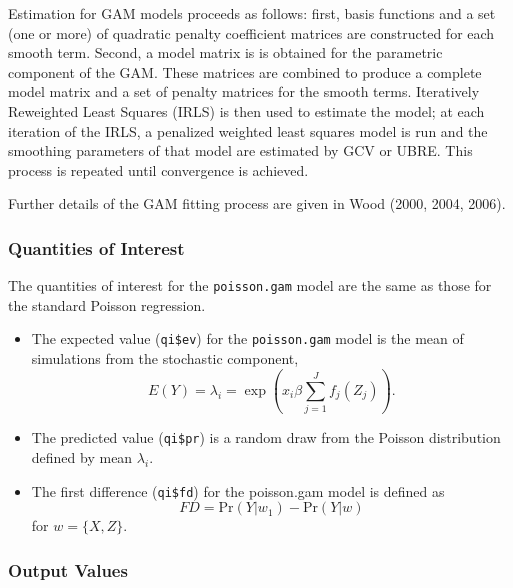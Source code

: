 Estimation for GAM models proceeds as follows: first, basis functions and a set (one or more) of quadratic penalty coefficient matrices are constructed for each smooth term. Second, a model matrix is is obtained for the parametric component of the GAM. These matrices are combined to produce a complete model matrix and a set of penalty matrices for the smooth terms. Iteratively Reweighted Least Squares (IRLS) is then used to estimate the model; at each iteration of the IRLS, a penalized weighted least squares model is run and the smoothing parameters of that model are estimated by GCV or UBRE. This process is repeated until convergence is achieved. 

Further details of the GAM fitting process are given in Wood (2000, 2004, 2006). 




\subsubsection{Quantities of Interest}
The quantities of interest for the {\tt poisson.gam} model are the same as those for the standard Poisson regression. 
\begin{itemize}
\item The expected value ({\tt qi\$ev}) for the {\tt poisson.gam} model is the mean of simulations from the stochastic component,  
\begin{equation*}
E(Y) = \lambda_{i} =  \exp \left(x_{i}\beta \sum_{j=1}^{J} f_j(Z_j) \right).
\end{equation*}


\item The predicted value ({\tt qi\$pr}) is a random draw from the Poisson distribution defined by mean $\lambda_i$. 

\item The first difference ({\tt qi\$fd}) for the poisson.gam model is defined as 
\begin{equation*}
FD = \text{Pr}(Y| w_{1}) - \text{Pr}(Y| w)
\end{equation*}
for $w=\{X, Z\}$.
\end{itemize}



\subsubsection{Output Values}



